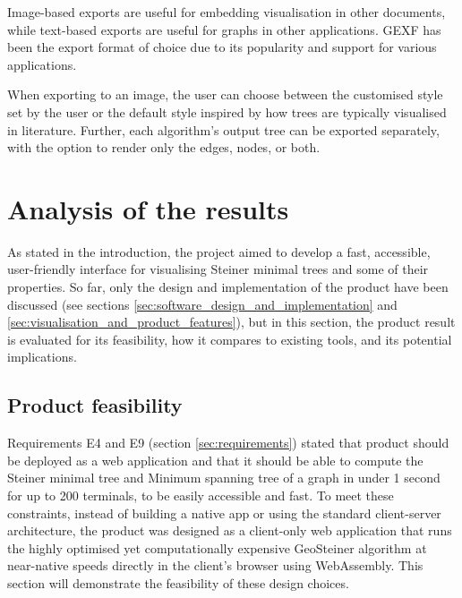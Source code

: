 \documentclass{l4proj}
\begin{document}
Image-based exports are useful for embedding visualisation in other documents, while text-based exports are useful for graphs in other applications. GEXF has been the export format of choice due to its popularity and support for various applications.

When exporting to an image, the user can choose between the customised style set by the user or the default style inspired by how trees are typically visualised in literature. Further, each algorithm's output tree can be exported separately, with the option to render only the edges, nodes, or both.




\chapter{Analysis of the results}
\label{sec:analysis_results}
As stated in the introduction, the project aimed to develop a fast, accessible, user-friendly interface for visualising Steiner minimal trees and some of their properties.
So far, only the design and implementation of the product have been discussed (see sections \ref{sec:software_design_and_implementation} and \ref{sec:visualisation_and_product_features}), but in this section, the product result is evaluated for its feasibility, how it compares to existing tools, and its potential implications.

\section{Product feasibility}
Requirements E4 and E9 (section \ref{sec:requirements}) stated that product should be deployed as a web application and that it should be able to compute the Steiner minimal tree and Minimum spanning tree of a graph in under 1 second for up to 200 terminals, to be easily accessible and fast. To meet these constraints, instead of building a native app or using the standard client-server architecture, the product was designed as a client-only web application that runs the highly optimised yet computationally expensive GeoSteiner algorithm at near-native speeds directly in the client's browser using WebAssembly.
This section will demonstrate the feasibility of these design choices.
\end{document}
